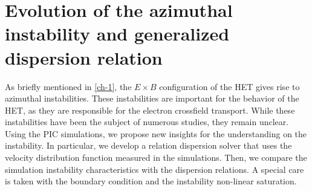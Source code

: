 



\chapter{Evolution of the azimuthal instability and generalized dispersion relation}
\label{ch-5}



\begin{Chabstract}
  
As briefly mentioned in \cref{ch-1}, the $E \times B$ configuration of the \ac{HET} gives rise to azimuthal instabilities.
These instabilities are important for the behavior of the \ac{HET}, as they are responsible for the electron crossfield transport.
While these instabilities have been the subject of numerous studies, they remain unclear.
Using the \ac{PIC} simulations, we propose new insights for the understanding on the instability.
In particular, we develop a relation dispersion solver that uses the velocity distribution function measured in the simulations.
Then, we compare the simulation instability characteristics with the dispersion relations.
A special care is taken with the boundary condition and the instability non-linear saturation.
\end{Chabstract}

% 
% 

\minitoc








